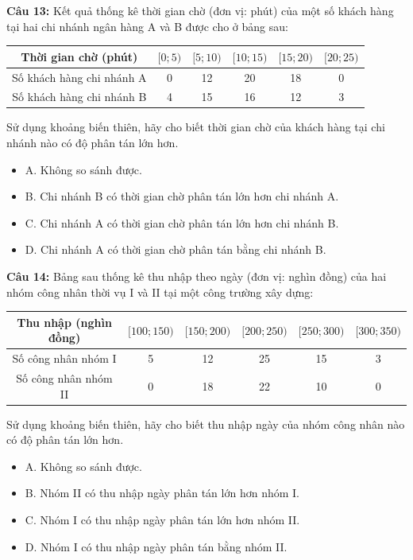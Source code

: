 \documentclass[12pt]{article}
\begin{document}
	\vspace{4mm}
	
	\noindent \textbf{Câu 13:} Kết quả thống kê thời gian chờ (đơn vị: phút) của một số khách hàng tại hai chi nhánh ngân hàng A và B được cho ở bảng sau:
	\begin{center}
		\renewcommand{\arraystretch}{1.3}
		\begin{tabular}{|c|c|c|c|c|c|}
			\hline
			Thời gian chờ (phút) & $[0; 5)$ & $[5; 10)$ & $[10; 15)$ & $[15; 20)$ & $[20; 25)$ \\
			\hline
			Số khách hàng chi nhánh A & 0 & 12 & 20 & 18 & 0 \\
			\hline
			Số khách hàng chi nhánh B & 4 & 15 & 16 & 12 & 3 \\
			\hline
		\end{tabular}
	\end{center}
	Sử dụng khoảng biến thiên, hãy cho biết thời gian chờ của khách hàng tại chi nhánh nào có độ phân tán lớn hơn.
	\begin{itemize}[label=, leftmargin=*]
		\item A. Không so sánh được.
		\item B. Chi nhánh B có thời gian chờ phân tán lớn hơn chi nhánh A.
		\item C. Chi nhánh A có thời gian chờ phân tán lớn hơn chi nhánh B.
		\item D. Chi nhánh A có thời gian chờ phân tán bằng chi nhánh B.
	\end{itemize}
	
	\vspace{4mm}
	
	\noindent \textbf{Câu 14:} Bảng sau thống kê thu nhập theo ngày (đơn vị: nghìn đồng) của hai nhóm công nhân thời vụ I và II tại một công trường xây dựng:
	\begin{center}
		\renewcommand{\arraystretch}{1.3}
		\begin{tabular}{|c|c|c|c|c|c|}
			\hline
			Thu nhập (nghìn đồng) & $[100; 150)$ & $[150; 200)$ & $[200; 250)$ & $[250; 300)$ & $[300; 350)$ \\
			\hline
			Số công nhân nhóm I & 5 & 12 & 25 & 15 & 3 \\
			\hline
			Số công nhân nhóm II & 0 & 18 & 22 & 10 & 0 \\
			\hline
		\end{tabular}
	\end{center}
	Sử dụng khoảng biến thiên, hãy cho biết thu nhập ngày của nhóm công nhân nào có độ phân tán lớn hơn.
	\begin{itemize}[label=, leftmargin=*]
		\item A. Không so sánh được.
		\item B. Nhóm II có thu nhập ngày phân tán lớn hơn nhóm I.
		\item C. Nhóm I có thu nhập ngày phân tán lớn hơn nhóm II.
		\item D. Nhóm I có thu nhập ngày phân tán bằng nhóm II.
	\end{itemize}
	
\end{document}
